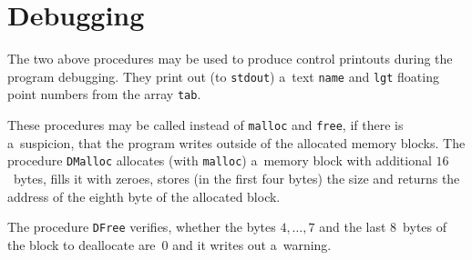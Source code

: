 \section{Debugging}

\hspace*{\parindent}
The two above procedures may be used to produce control printouts
during the program debugging. They print out (to \texttt{stdout})
a~text \texttt{name} and \texttt{lgt} floating point numbers from
the array \texttt{tab}.

\vspace{\bigskipamount}
These procedures may be called instead of \texttt{malloc} and \texttt{free},
if there is a~suspicion, that the program writes outside of the allocated
memory blocks. The procedure \texttt{DMalloc} allocates (with \texttt{malloc})
a~memory block with additional $16$~bytes, fills it with zeroes,
stores (in the first four bytes) the size and returns the address of the
eighth byte of the allocated block.

The procedure \texttt{DFree} verifies, whether the bytes $4,\ldots,7$ and
the last $8$~bytes of the block to deallocate are~$0$ and it writes out
a~warning.

